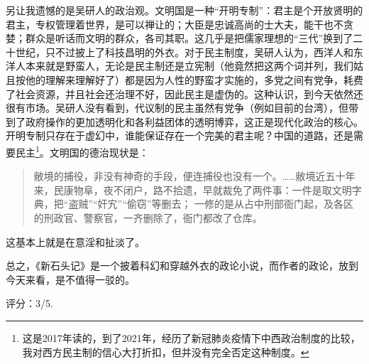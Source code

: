 另让我遗憾的是吴研人的政治观。文明国是一种“开明专制”：君主是个开放贤明的君主，专权管理着世界，是可以禅让的；大臣是忠诚高尚的士大夫，能干也不贪婪；群众是听话而文明的群众，各司其职。这几乎是把儒家理想的“三代”换到了二十世纪，只不过披上了科技昌明的外衣。对于民主制度，吴研人认为，西洋人和东洋人本来就是野蛮人，无论是民主制还是立宪制（他竟然把这两个词并列，我们姑且按他的理解来理解好了）都是因为人性的野蛮才实施的，多党之间有党争，耗费了社会资源，并且社会还治理不好，因此民主是虚伪的。这种认识，到今天依然还很有市场。吴研人没有看到，代议制的民主虽然有党争（例如目前的台湾），但带到了政府操作的更加透明化和各利益团体的透明博弈，这正是现代化政治的核心。开明专制只存在于虚幻中，谁能保证存在一个完美的君主呢？中国的道路，还是需要民主\footnote{这是2017年读的，到了2021年，经历了新冠肺炎疫情下中西政治制度的比较，我对西方民主制的信心大打折扣，但并没有完全否定这种制度。}。文明国的德治现状是：
\begin{quotation}
	敝境的捕役，非没有神奇的手段，便连捕役也没有一个。……敝境近五十年来，民康物阜，夜不闭户，路不拾遗，早就裁免了两件事：一件是取文明字典，把“盗贼”“奸宄”“偷窃”等删去； 一修的是从占中刑部衙门起，及各区的刑政官、警察官，一齐删除了，衙门都改了仓库。
\end{quotation}
这基本上就是在意淫和扯淡了。

总之，《新石头记》是一个披着科幻和穿越外衣的政论小说，而作者的政论，放到今天来看，是不值得一驳的。

评分：3/5.